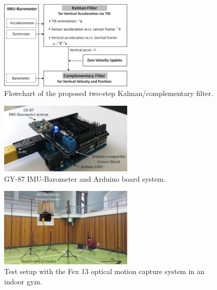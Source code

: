 \documentclass[10pt,journal,compsoc]{IEEEtran}
\begin{document}

\begin{figure}[!t]
\centering
\includegraphics[width=2.5in]{fig1}
    \caption{Flowchart of the proposed two-step Kalman/complementary filter.}
\label{fig1}
\end{figure}

\begin{figure}[!t]
\centering
\includegraphics[width=2.5in]{fig2}
\caption{GY-87 IMU-Barometer and Arduino board system.}
\label{fig2}
\end{figure}

\begin{figure}[!t]
\centering
\includegraphics[width=2.5in]{fig3}
\caption{Test setup with the Fex 13 optical motion capture system in an indoor gym.}
\label{fig3}
\end{figure}
\end{document}
